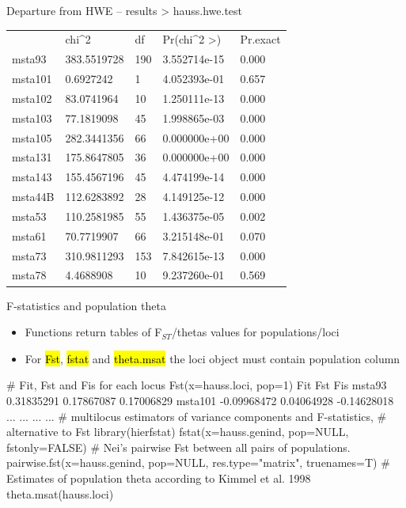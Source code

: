 \documentclass[compress, ucs, xelatex, 11pt, xcolor=svgnames,
  hyperref={
    bookmarks=true,
    unicode=true,
    colorlinks=true,
    pdftitle={Molecular data in R},
    plainpages=false,
    pdfauthor={Vojtech Zeisek},
    pdfsubject={Course about phylogeny and evolution in R},
    pdfcreator={XeLaTeX},
    pdfkeywords={R, evolution, phylogeny, molecular data},
    linkcolor=Tomato,
    anchorcolor=SaddleBrown,
    citecolor=Goldenrod,
    filecolor=DarkMagenta,
    menucolor=Sienna,
    urlcolor=DarkTurquoise,
    pdftex},
  url={hyphens, lowtilde} %
  ]{beamer}
\renewcommand{\texttt}[1]{\hl{\ttfamily #1}}
\begin{document}
\begin{frame}[fragile]{Departure from HWE -- results}
  > hauss.hwe.test

  \begin{tabular}{lllll}
    & chi\textasciicircum2 & df & Pr(chi\textasciicircum2 >) & Pr.exact\\
    msta93 & 383.5519728 & 190 & 3.552714e-15 & 0.000\\
    msta101 & 0.6927242 & 1 & 4.052393e-01 & 0.657\\
    msta102 & 83.0741964 & 10 & 1.250111e-13 & 0.000\\
    msta103 & 77.1819098 & 45 & 1.998865e-03 & 0.000\\
    msta105 & 282.3441356 & 66 & 0.000000e+00 & 0.000\\
    msta131 & 175.8647805 & 36 & 0.000000e+00 & 0.000\\
    msta143 & 155.4567196 & 45 & 4.474199e-14 & 0.000\\
    msta44B & 112.6283892 & 28 & 4.149125e-12 & 0.000\\
    msta53 & 110.2581985 & 55 & 1.436375e-05 & 0.002\\
    msta61 & 70.7719907 & 66 & 3.215148e-01 & 0.070\\
    msta73 & 310.9811293 & 153 & 7.842615e-13 & 0.000\\
    msta78 & 4.4688908 & 10 & 9.237260e-01 & 0.569
  \end{tabular}
\end{frame}

\begin{frame}[fragile]{F-statistics and population theta}
  \begin{itemize}
    \item Functions return tables of F$_{ST}$/thetas values for populations/loci
    \item For \texttt{Fst}, \texttt{fstat} and \texttt{theta.msat} the loci object must contain population column
  \end{itemize}
  \begin{spluscode}
    # Fit, Fst and Fis for each locus
    Fst(x=hauss.loci, pop=1)
                    Fit        Fst         Fis
    msta93   0.31835291 0.17867087  0.17006829
    msta101 -0.09968472 0.04064928 -0.14628018
        ...         ...        ...         ...
    # multilocus estimators of variance components and F-statistics,
    # alternative to Fst
    library(hierfstat)
    fstat(x=hauss.genind, pop=NULL, fstonly=FALSE)
    # Nei's pairwise Fst between all pairs of populations.
    pairwise.fst(x=hauss.genind, pop=NULL, res.type="matrix", truenames=T)
    # Estimates of population theta according to Kimmel et al. 1998
    theta.msat(hauss.loci)
  \end{spluscode}
\end{frame}
\end{document}
